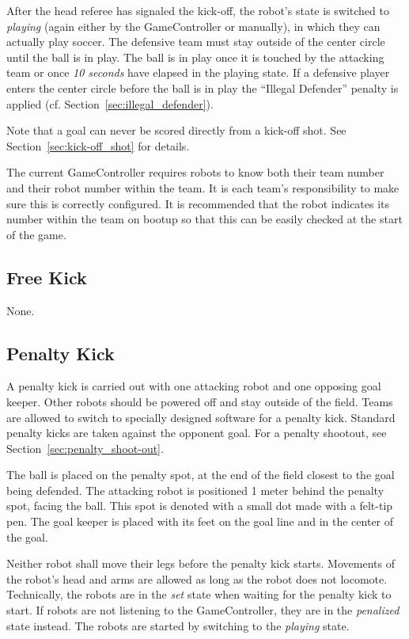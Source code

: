 \documentclass[12pt]{article}
\newcommand{\cf}{\mbox{cf.}\xspace}
\begin{document}
After the head referee has signaled the kick-off, the robot's state is switched to \emph{playing} (again either by the GameController or manually), in which they can actually play soccer.
The defensive team must stay outside of the center circle until the ball is in play.  The ball is in play once it is touched by the attacking team or once \emph{10 seconds} have elapsed in the playing state. If a defensive player enters the center circle before the ball is in play the ``Illegal Defender'' penalty is applied (\cf Section~\ref{sec:illegal_defender}).

Note that a goal can never be scored directly from a kick-off shot. See Section~\ref{sec:kick-off_shot} for details.

The current GameController requires robots to know both their team number and their robot number within the team. It is each team's responsibility to make sure this is correctly configured. It is recommended that the robot indicates its number within the team on bootup so that this can be easily checked at the start of the game.

\subsection{Free Kick}

None.

\subsection{Penalty Kick}
\label{sec:penalty_kick}

A penalty kick is carried out with one attacking robot and one opposing goal keeper. Other robots should be powered off and stay outside of the field. Teams are allowed to switch to specially designed software for a penalty kick. Standard penalty kicks are taken against the opponent goal. For a penalty shootout, see Section~\ref{sec:penalty_shoot-out}.

The ball is placed on the penalty spot, at the end of the field closest to the goal being defended. The attacking robot is positioned 1 meter behind the penalty spot, facing the ball.  This spot is denoted with a small dot made with a felt-tip pen. The goal keeper is placed with its feet on the goal line and in the center of the goal.

Neither robot shall move their legs before the penalty kick starts. Movements of the robot's head and arms are allowed as long as the robot does not locomote. Technically, the robots are in the \emph{set} state when waiting for the penalty kick to start. If robots are not listening to the GameController, they are in the \emph{penalized} state instead. The robots are started by switching to the \emph{playing} state.
\end{document}

